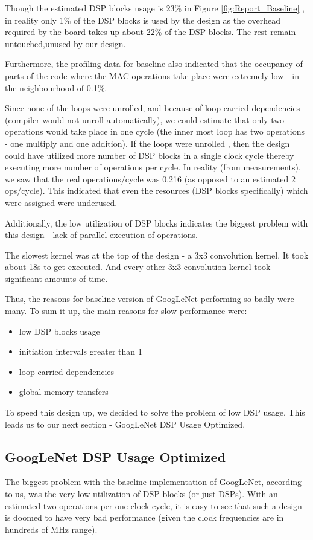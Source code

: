 Though the estimated DSP blocks usage is 23\% in Figure \ref{fig:Report_Baseline} , in reality only 1\% of the DSP blocks is used by the design as the overhead required by the board takes up about 22\% of the DSP blocks. The rest remain untouched,unused by our design.

Furthermore, the profiling data for baseline also indicated that the occupancy of  parts of the code where the MAC operations take place were extremely low - in the neighbourhood of 0.1\%. 

Since none of the loops were unrolled, and because of loop carried dependencies (compiler would not unroll automatically), we could estimate that only two operations would take place in one cycle (the inner most loop has two operations - one multiply and one addition). If the loops were unrolled , then the design could have utilized more number of DSP blocks in a single clock cycle thereby executing more number of operations per cycle. In reality (from measurements), we saw that the real operations/cycle was 0.216 (as opposed to an estimated 2 ops/cycle). This indicated that even the resources (DSP blocks specifically) which were assigned were underused.   

Additionally, the low utilization of DSP blocks indicates the biggest problem with this design - lack of parallel execution of operations.  

The slowest kernel was at the top of the design - a 3x3 convolution kernel. It took about 18s to get executed. And every other 3x3 convolution kernel took significant amounts of time.

Thus, the reasons for baseline version of GoogLeNet performing so badly were many. To sum it up, the main reasons for slow performance were:
\begin{itemize}
    \item low DSP blocks usage
    \item initiation intervals greater than 1
    \item loop carried dependencies 
    \item global memory transfers
\end{itemize}

To speed this design up, we decided to solve the problem of low DSP usage. This leads us to our next section - GoogLeNet DSP Usage Optimized.

\subsection{GoogLeNet DSP Usage Optimized}
The biggest problem with the baseline implementation of GoogLeNet, according to us, was the very low utilization of DSP blocks (or just DSPs). With an estimated two operations per one clock cycle, it is easy to see that such a design is doomed to have very bad performance (given the clock frequencies are in hundreds of MHz range).
 
